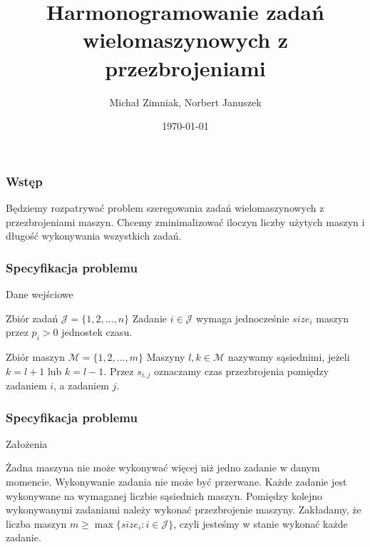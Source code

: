 \documentclass{beamer}
\title[]{Harmonogramowanie zadań wielomaszynowych z przezbrojeniami} %
\author{Michał Zimniak, Norbert Januszek} %
\institute[] %
{
Uniwersytet Wrocławski \\ %
\medskip
\textit{zimniak.michal@gmail.com} %
\textit{traspie@wp.pl}
}
\date{\today} %
\begin{document}
\begin{frame}
\titlepage %
\end{frame}

%
%


\begin{frame}
\frametitle{Wstęp}
Będziemy rozpatrywać problem szeregowania zadań wielomaszynowych z przezbrojeniami maszyn.
Chcemy zminimalizować iloczyn liczby użytych maszyn i długość wykonywania wszystkich zadań.
\end{frame}

\begin{frame}
    \frametitle{Specyfikacja problemu}
    Dane wejściowe
    \begin{outline}
        \1 Zbiór zadań $\mathcal{J}=\{1,2,\dots,n\}$
        \2 Zadanie $i\in\mathcal{J}$ wymaga jednocześnie $size_i$ maszyn przez $p_i>0$
        jednostek czasu.
        
        \1 Zbiór maszyn $\mathcal{M}=\{1,2,\dots,m\}$
        \2 Maszyny $l,k\in\mathcal{M}$ nazywamy sąsiednimi, jeżeli $k=l+1$ lub $k=l-1$.
        \2 Przez $s_{i,j}$ oznaczamy czas przezbrojenia pomiędzy zadaniem $i$, a zadaniem $j$.
    \end{outline}
\end{frame}

\begin{frame}
    \frametitle{Specyfikacja problemu}
    Założenia
    \begin{outline}
        \1 Żadna maszyna nie może wykonywać więcej niż jedno zadanie w danym momencie.
        \1 Wykonywanie zadania nie może być przerwane.
        \1 Każde zadanie jest wykonywane na wymaganej liczbie sąsiednich maszyn.
        \1 Pomiędzy kolejno wykonywanymi zadaniami należy wykonać przezbrojenie maszyny.
        \1 Zakładamy, że liczba maszyn $m\ge\max\{size_i : i\in\mathcal{J}\}$, czyli jesteśmy
        w stanie wykonać każde zadanie.
    \end{outline}
\end{frame}
\end{document}
